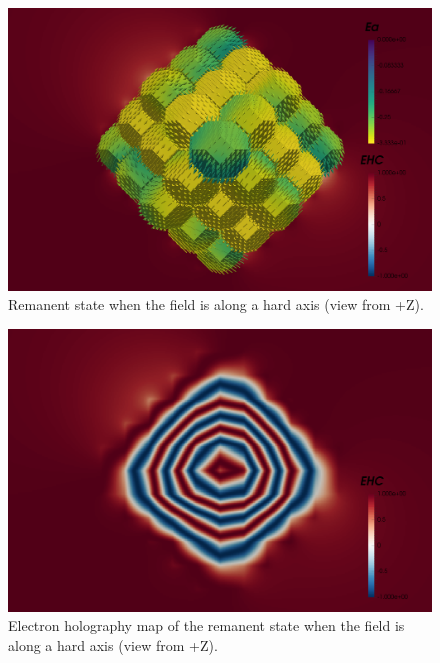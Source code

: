\begin{figure}
\centering
\includegraphics[width=\textwidth]{research-4/figs/fram_i16_f0_-z.png}
\caption[Remanent state when the field is along a hard axis (view from +Z)]{Remanent state when the field is along a hard axis (view from +Z).}
\label{FIG_21}
\end{figure}

\begin{figure}
\centering
\includegraphics[width=\textwidth]{research-4/figs/fram_i16_f0_-z_EHC.png}
\caption[Electron holography map of the remanent state when the field is along a hard axis (view from +Z)]{Electron holography map of the remanent state when the field is along a hard axis (view from +Z).}
\label{FIG_22}
\end{figure}

